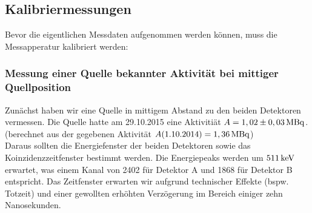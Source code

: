 \subsection{Kalibriermessungen}
Bevor die eigentlichen Messdaten aufgenommen werden können, muss die Messapperatur kalibriert werden:
    \subsubsection{Messung einer Quelle bekannter Aktivität bei mittiger Quellposition} \label{dft:kalib_mitte}
       Zunächst haben wir eine Quelle in mittigem Abstand zu den beiden Detektoren vermessen. Die Quelle hatte am 29.10.2015 eine Aktivitiät $A = \unit[1,02 \pm 0,03]{MBq}$. (berechnet aus der gegebenen Aktivität $A(1.10.2014) = \unit[1,36]{MBq}$)\\
       Daraus sollten die Energiefenster der beiden Detektoren sowie das Koinzidenzzeitfenster bestimmt werden. Die Energiepeaks werden um $\unit[511]{keV}$ erwartet, was einem
       Kanal von 2402 für Detektor A und 1868 für Detektor B entspricht. Das Zeitfenster erwarten wir aufgrund technischer Effekte (bspw. Totzeit) und einer gewollten
       erhöhten Verzögerung im Bereich einiger zehn Nanosekunden.  
       \vspace{2mm}
        
